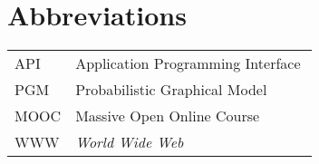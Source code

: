 \chapter*{Abbreviations}

\begin{flushleft}
\begin{tabular}{l p{0.8\linewidth}}
API      & Application Programming Interface\\
PGM      & Probabilistic Graphical Model\\
MOOC     & Massive Open Online Course\\
WWW      & \emph{World Wide Web}
\end{tabular}
\end{flushleft}
